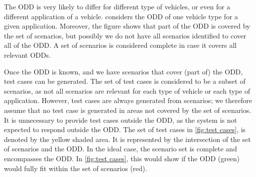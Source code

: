 The ODD is very likely to differ for different type of vehicles, or even for a different application of a vehicle.  considers the ODD of one vehicle type for a given application. Moreover, the figure shows that part of the ODD is covered by the set of scenarios, but possibly we do not have all scenarios identified to cover all of the ODD. A set of scenarios is considered complete in case it covers all relevant ODDs. 

Once the ODD is known, and we have scenarios that cover (part of) the ODD, test cases can be generated. The set of test cases is considered to be a subset of scenarios, as not all scenarios are relevant for each type of vehicle or each type of application. However, test cases are always generated from scenarios; we therefore assume that no test case is generated in areas not covered by the set of scenarios. It is unnecessary to provide test cases outside the ODD, as the system is not expected to respond outside the ODD. The set of test cases in \cref{fig:test cases}, is denoted by the yellow shaded area. It is represented by the intersection of the set of scenarios and the ODD. In the ideal case, the scenario set is complete and encompasses the ODD. In \cref{fig:test cases}, this would show if the ODD (green) would fully fit within the set of scenarios (red).

